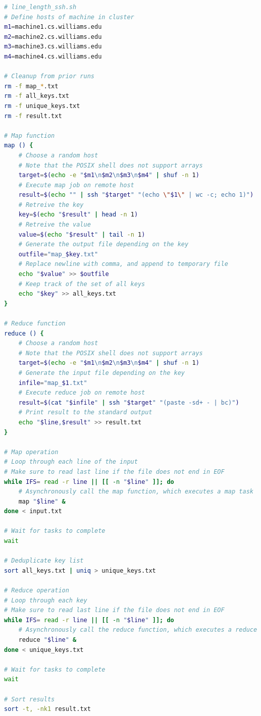 \documentclass[oneside]{report}
\begin{document}
\lstset{xleftmargin=15pt}
\begin{lstlisting}[language=bash]
# line_length_ssh.sh
# Define hosts of machine in cluster
m1=machine1.cs.williams.edu
m2=machine2.cs.williams.edu
m3=machine3.cs.williams.edu
m4=machine4.cs.williams.edu

# Cleanup from prior runs
rm -f map_*.txt
rm -f all_keys.txt
rm -f unique_keys.txt
rm -f result.txt

# Map function
map () {
    # Choose a random host
    # Note that the POSIX shell does not support arrays
    target=$(echo -e "$m1\n$m2\n$m3\n$m4" | shuf -n 1)
    # Execute map job on remote host
    result=$(echo "" | ssh "$target" "(echo \"$1\" | wc -c; echo 1)")
    # Retreive the key
    key=$(echo "$result" | head -n 1)
    # Retreive the value
    value=$(echo "$result" | tail -n 1)
    # Generate the output file depending on the key
    outfile="map_$key.txt"
    # Replace newline with comma, and append to temporary file
    echo "$value" >> $outfile
    # Keep track of the set of all keys
    echo "$key" >> all_keys.txt
}

# Reduce function
reduce () {
    # Choose a random host
    # Note that the POSIX shell does not support arrays
    target=$(echo -e "$m1\n$m2\n$m3\n$m4" | shuf -n 1)
    # Generate the input file depending on the key
    infile="map_$1.txt"
    # Execute reduce job on remote host
    result=$(cat "$infile" | ssh "$target" "(paste -sd+ - | bc)")
    # Print result to the standard output
    echo "$line,$result" >> result.txt
}

# Map operation
# Loop through each line of the input
# Make sure to read last line if the file does not end in EOF
while IFS= read -r line || [[ -n "$line" ]]; do
    # Asynchronously call the map function, which executes a map task
    map "$line" &
done < input.txt

# Wait for tasks to complete
wait

# Deduplicate key list
sort all_keys.txt | uniq > unique_keys.txt

# Reduce operation
# Loop through each key
# Make sure to read last line if the file does not end in EOF
while IFS= read -r line || [[ -n "$line" ]]; do
    # Asynchronously call the reduce function, which executes a reduce task
    reduce "$line" &
done < unique_keys.txt

# Wait for tasks to complete
wait

# Sort results
sort -t, -nk1 result.txt
\end{lstlisting}
\lstset{xleftmargin=0pt}
\end{document}
